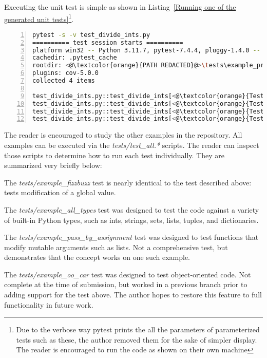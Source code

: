Executing the unit test is simple as shown in Listing~\ref{Running one of the generated unit tests}\footnote{Due to the verbose way pytest prints the 
all the parameters of  parameterized tests such as these, the author removed
them for the sake of simpler display.  The reader is encouraged to run the code 
as shown on their own machine}.

\begin{lstlisting}[language=bash, numbers=left, caption={Running one of the generated unit tests}]
pytest -s -v test_divide_ints.py
========== test session starts ==========
platform win32 -- Python 3.11.7, pytest-7.4.4, pluggy-1.4.0 -- <@\textcolor{orange}{PATH REDACTED}@>\.venv\Scripts\python.exe
cachedir: .pytest_cache
rootdir: <@\textcolor{orange}{PATH REDACTED}@>\tests\example_procedural_division
plugins: cov-5.0.0
collected 4 items

test_divide_ints.py::test_divide_ints[<@\textcolor{orange}{Test \#1 arguments SNIPPED}@>] <@\textcolor{green}{PASSED}@>
test_divide_ints.py::test_divide_ints[<@\textcolor{orange}{Test \#2 arguments SNIPPED}@>] <@\textcolor{green}{PASSED}@>
test_divide_ints.py::test_divide_ints[<@\textcolor{orange}{Test \#3 arguments SNIPPED}@>] <@\textcolor{green}{PASSED}@>
test_divide_ints.py::test_divide_ints[<@\textcolor{orange}{Test \#4 arguments SNIPPED}@>] <@\textcolor{green}{PASSED}@>
\end{lstlisting}

The reader is encouraged to study the other examples in the repository.
All examples can be executed via the 
\textit{tests/test\_all.*} scripts.  The reader can inspect those scripts
to determine how to run each test individually. 
They are summarized very briefly below:

The \textit{tests/example\_fizzbuzz} test is nearly identical to the 
test described above: tests modification of a global value.

The \textit{tests/example\_all\_types} test was designed to test
the code against a variety of built-in Python types, 
such as ints, strings, sets, lists, tuples, and dictionaries.

The \textit{tests/example\_pass\_by\_assignment} test was designed to test
functions that modify mutable arguments such as lists. Not a comprehensive test,
but demonstrates that the concept works on one such example.

The \textit{tests/example\_oo\_car} test was designed to test
object-oriented code. Not complete at the time of submission, but worked in a 
previous branch prior to adding support for the test above.
The author hopes to restore this feature to full functionality in future work.
%
